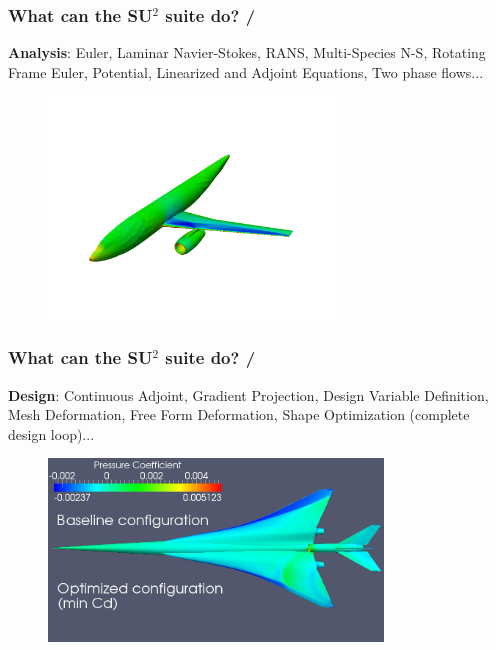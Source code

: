 \documentclass[handout,table]{beamer}
\begin{document}
\begin{frame}[t]
\frametitle{What can the SU$^2$ suite do? \hfill  \small{ \insertframenumber/\inserttotalframenumber} }

{\bf Analysis}: Euler, Laminar Navier-Stokes, RANS, Multi-Species N-S, Rotating Frame Euler, Potential, Linearized and Adjoint Equations, Two phase flows...

\begin{figure}
\begin{center}
\includegraphics[width=3.0in]{DLRF6.pdf}
\label{analysis}
\end{center}
\end{figure}


\end{frame}


\begin{frame}[t]
\frametitle{What can the SU$^2$ suite do? \hfill  \small{ \insertframenumber/\inserttotalframenumber} }

{\bf Design}: Continuous Adjoint, Gradient Projection, Design Variable Definition, Mesh Deformation, Free Form Deformation, Shape Optimization (complete design loop)...

\begin{figure}
\begin{center}
\includegraphics[width=3.5in]{Upper_CdDesign.jpg}
\label{design}
\end{center}
\end{figure}

\end{frame}
\end{document}
